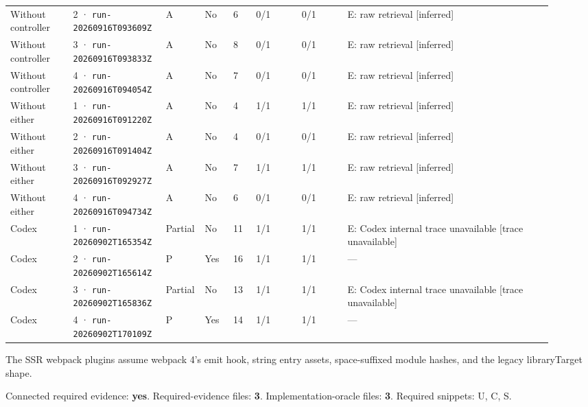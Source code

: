 \begin{landscape}
\begin{longtable}{@{}L{0.11\linewidth}L{0.16\linewidth}*{1}{L{0.022\linewidth}}L{0.05\linewidth}L{0.045\linewidth}L{0.08\linewidth}L{0.085\linewidth}L{0.368\linewidth}@{}}
Without controller & 2 · \texttt{run-20260916\allowbreak T093609Z} & A & No & 6 & 0/1 & 0/1 & E: raw retrieval [inferred] \\
Without controller & 3 · \texttt{run-20260916\allowbreak T093833Z} & A & No & 8 & 0/1 & 0/1 & E: raw retrieval [inferred] \\
Without controller & 4 · \texttt{run-20260916\allowbreak T094054Z} & A & No & 7 & 0/1 & 0/1 & E: raw retrieval [inferred] \\
Without either & 1 · \texttt{run-20260916\allowbreak T091220Z} & A & No & 4 & 1/1 & 1/1 & E: raw retrieval [inferred] \\
Without either & 2 · \texttt{run-20260916\allowbreak T091404Z} & A & No & 4 & 0/1 & 0/1 & E: raw retrieval [inferred] \\
Without either & 3 · \texttt{run-20260916\allowbreak T092927Z} & A & No & 7 & 1/1 & 1/1 & E: raw retrieval [inferred] \\
Without either & 4 · \texttt{run-20260916\allowbreak T094734Z} & A & No & 6 & 0/1 & 0/1 & E: raw retrieval [inferred] \\
Codex & 1 · \texttt{run-20260902\allowbreak T165354Z} & Partial & No & 11 & 1/1 & 1/1 & E: Codex internal trace unavailable [trace unavailable] \\
Codex & 2 · \texttt{run-20260902\allowbreak T165614Z} & P & Yes & 16 & 1/1 & 1/1 & --- \\
Codex & 3 · \texttt{run-20260902\allowbreak T165836Z} & Partial & No & 13 & 1/1 & 1/1 & E: Codex internal trace unavailable [trace unavailable] \\
Codex & 4 · \texttt{run-20260902\allowbreak T170109Z} & P & Yes & 14 & 1/1 & 1/1 & --- \\
\end{longtable}
\endgroup
\end{landscape}

\label{sec:vuejs-vue-11718}

The SSR webpack plugins assume webpack 4's emit hook, string entry assets, space-suffixed module hashes, and the legacy libraryTarget shape.

Connected required evidence: \textbf{yes}. Required-evidence files: \textbf{3}. Implementation-oracle files: \textbf{3}. Required snippets: U, C, S.

